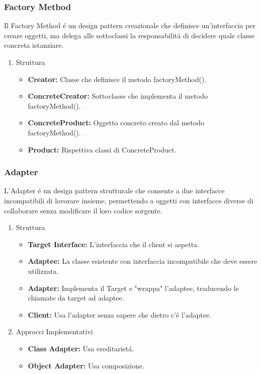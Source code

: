 \documentclass[11pt]{article}
\begin{document}
\subsubsection{Factory Method}
\label{sec:orga801424}
Il Factory Method é un design pattern creazionale che definisce un'interfaccia per creare oggetti, ma delega alle sottoclassi la responsabilitá di decidere quale classe concreta istanziare.
\begin{enumerate}
\item Struttura
\label{sec:org7ba9ab9}
\begin{itemize}
\item \textbf{\textbf{Creator:}} Classe che definisce il metodo factoryMethod().
\item \textbf{\textbf{ConcreteCreator:}} Sottoclasse che implementa il metodo factoryMethod().
\item \textbf{\textbf{ConcreteProduct:}} Oggetto concreto creato dal metodo factoryMethod().
\item \textbf{\textbf{Product:}} Rispettiva classi di ConcreteProduct.
\end{itemize}
\end{enumerate}
\subsubsection{Adapter}
\label{sec:org97d9fea}
L'Adapter é un design pattern strutturale che consente a due interfacce incompatibili di lavorare insieme, permettendo a oggetti con interfacce diverse di collaborare senza modificare il loro codice sorgente.
\begin{enumerate}
\item Struttura
\label{sec:orgfdaa8e5}
\begin{itemize}
\item \textbf{\textbf{Target Interface:}} L'interfaccia che il client si aspetta.
\item \textbf{\textbf{Adaptee:}} La classe esistente con interfaccia incompatibile che deve essere utilizzata.
\item \textbf{\textbf{Adapter:}} Implementa il Target e "wrappa" l'adaptee, traducendo le chiamate da target ad adaptee.
\item \textbf{\textbf{Client:}} Usa l'adapter senza sapere che dietro c'é l'adaptee.
\end{itemize}
\item Approcci Implementativi
\label{sec:orgce6ef74}
\begin{itemize}
\item \textbf{\textbf{Class Adapter:}} Usa ereditarietá.
\item \textbf{\textbf{Object Adapter:}} Usa composizione.
\end{itemize}
\end{enumerate}
\end{document}
